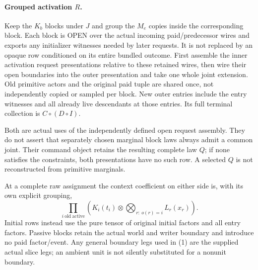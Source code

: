 \documentclass[11pt]{article}\usepackage{amsmath,amssymb,amsthm,geometry}\geometry{margin=1in}
\begin{document}
\paragraph{Grouped activation $R$.} Keep the $K_b$ blocks under $J$ and group the $M_e$ copies inside the corresponding block. Each block is OPEN over the actual incoming paid/predecessor wires and exports any initializer witnesses needed by later requests. It is not replaced by an opaque row conditioned on its entire bundled outcome. First assemble the inner activation request presentations relative to these retained wires, then wire their open boundaries into the outer presentation and take one whole joint extension. Old primitive actors and the original paid tuple are shared once, not independently copied or sampled per block. New outer entries include the entry witnesses and all already live descendants at those entries. Its full terminal collection is $C\circ(D\circ I)$.

Both are actual uses of the independently defined open request assembly. They do not assert that separately chosen marginal block laws always admit a common joint. Their command object retains the resulting complete law $Q$; if none satisfies the constraints, both presentations have no such row. A selected $Q$ is not reconstructed from primitive marginals.

At a complete raw assignment the context coefficient on either side is, with its own explicit grouping,
\[
 \prod_{i\ \mathrm{old\ active}}
 \left(K_i(t_i)\otimes
              \bigotimes_{r:\ o(r)=i}L_r(x_r)\right).                 \tag{1}
\]
Initial rows instead use the pure tensor of original initial factors and all entry factors. Passive blocks retain the actual world and writer boundary and introduce no paid factor/event. Any general boundary legs used in (1) are the supplied actual slice legs; an ambient unit is not silently substituted for a nonunit boundary.
\end{document}

